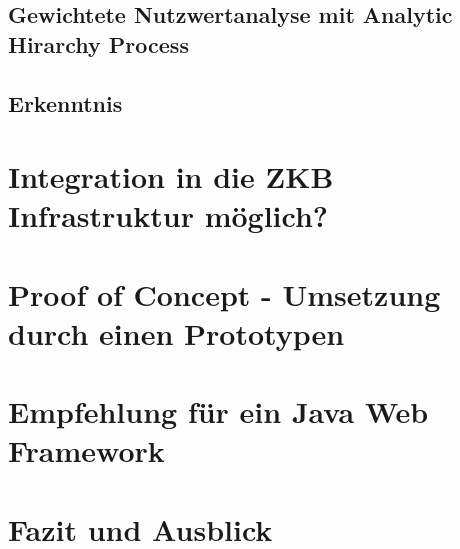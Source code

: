 \documentclass[
11pt, %
a4paper, %
BCOR25mm, %
DIV14, %
footsepline = false, %
headsepline, %
twoside, %
openright,
abstracton, %
listof=totocnumbered, %
bibliography=totocnumbered %
]{scrreprt}
\begin{document}
  \section{Gewichtete Nutzwertanalyse mit Analytic Hirarchy Process}
  
  \section{Erkenntnis}
  
  \cleardoublepage
  
   
  \chapter{Integration in die ZKB Infrastruktur möglich?}

  \cleardoublepage
  
  
  \chapter{Proof of Concept - Umsetzung durch einen Prototypen}

  \cleardoublepage  
  
   
  \chapter{Empfehlung für ein Java Web Framework}

  \cleardoublepage
  
   
  \chapter{Fazit und Ausblick} 
\end{document}

